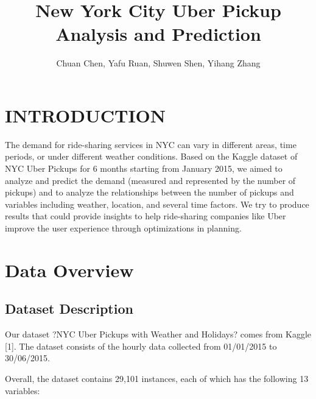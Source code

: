 \documentclass[article, 10 pt, conference]{ieeeconf}
\title{\LARGE \bf
New York City Uber Pickup Analysis and Prediction
}
\author{Chuan Chen, Yafu Ruan, Shuwen Shen, Yihang Zhang}
\begin{document}
\maketitle


\section{INTRODUCTION}

The demand for ride-sharing services in NYC can vary in different areas, time periods, or under different weather conditions. Based on the Kaggle dataset of NYC Uber Pickups for 6 months starting from January 2015, we aimed to analyze and predict the demand (measured and represented by the number of pickups) and to analyze the relationships between the number of pickups and variables including weather, location, and several time factors. We try to produce results that could provide insights to help ride-sharing companies like Uber improve the user experience through optimizations in planning.

\section{Data Overview}

\subsection{Dataset Description}

Our dataset ?NYC Uber Pickups with Weather and Holidays? comes from Kaggle [1]. The dataset consists of the hourly data collected from 01/01/2015 to 30/06/2015. 

Overall, the dataset contains 29,101 instances, each of which has the following 13 variables:
\end{document}
